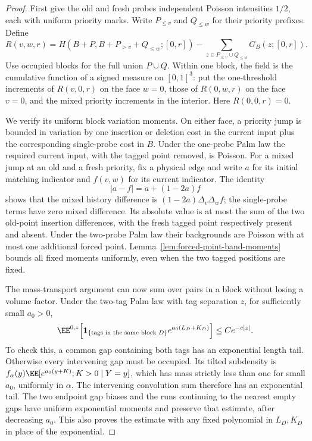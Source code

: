 \documentclass[11pt,letterpaper]{article}
\newcommand{\ind}{\mathbf 1}\newcommand{\Exp}{\operatorname{Exp}}
\begin{document}
\begin{proof}
First give the old and fresh probes independent Poisson
intensities $1/2$, each with uniform priority marks.
Write $P_{\le v}$ and $Q_{\le w}$ for their priority prefixes.
Define
\[
 R(v,w,r)=H(B+P,B+P_{>v}+Q_{\le w};[0,r])
       -\sum_{z\in P_{\le v}\cup Q_{\le w}}G_B(z;[0,r]).
\]
Use occupied blocks for the full union $P\cup Q$.
Within one block, the field is the cumulative function of
a signed measure on $[0,1]^3$: put the one-threshold
increments of $R(v,0,r)$ on the face $w=0$, those of
$R(0,w,r)$ on the face $v=0$, and the mixed priority
increments in the interior. Here $R(0,0,r)=0$.

We verify its uniform block variation moments.
On either face, a priority jump is bounded in variation
by one insertion or deletion cost in the current input
plus the corresponding single-probe cost in $B$.
Under the one-probe Palm law the required current input,
with the tagged point removed, is Poisson.
For a mixed jump at an old and a fresh priority, fix a
physical edge and write $a$ for its initial matching
indicator and $f(v,w)$ for its current indicator.
The identity
\[
 |a-f|=a+(1-2a)f
\]
shows that the mixed history difference is
$(1-2a)\Delta_v\Delta_w f$; the single-probe terms have
zero mixed difference.
Its absolute value is at most the sum of the two old-point
insertion differences, with the fresh tagged point respectively
present and absent. Under the two-probe Palm law their
backgrounds are Poisson with at most one additional forced
point. Lemma~\ref{lem:forced-point-band-moments} bounds all
fixed moments uniformly, even when the two tagged positions
are fixed.

The mass-transport argument can now sum over pairs in a
block without losing a volume factor. Under the two-tag
Palm law with tag separation $z$, for sufficiently small
$a_0>0$,
\begin{equation}\label{eq:two-tag-block-weight}
 \EE^{0,z}\!\left[
  \ind_{\{\text{tags in the same block }D\}}
             e^{a_0(L_D+K_D)}\right]\le Ce^{-c|z|}.
\end{equation}
To check this, a common gap containing both tags has an
exponential length tail. Otherwise every intervening gap
must be occupied. Its tilted subdensity is
$f_\alpha(y)\EE[e^{a_0(y+K)};K>0\mid Y=y]$, which has mass
strictly less than one for small $a_0$, uniformly in $\alpha$.
The intervening convolution sum therefore has an exponential
tail. The two endpoint gap biases and the runs continuing
to the nearest empty gaps have uniform exponential moments
and preserve that estimate, after decreasing $a_0$.
This also proves the estimate with any fixed polynomial
in $L_D,K_D$ in place of the exponential.


\end{proof}
\end{document}
